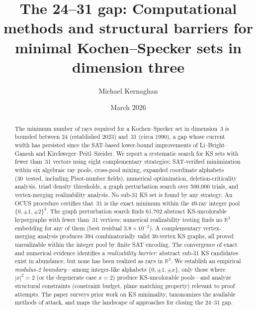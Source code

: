 \documentclass[twocolumn,pra,superscriptaddress,nofootinbib]{revtex4-2}
\newcommand{\R}{\mathbb{R}}
\begin{document}
\title{The 24--31 gap: Computational methods and structural barriers for minimal Kochen--Specker sets in dimension three}

\author{Michael Kernaghan}

\date{March 2026}

\begin{abstract}
The minimum number of rays required for a Kochen--Specker set in dimension~3
is bounded between 24 (established 2023) and~31 (circa 1990), a gap whose
current width has persisted since the SAT-based lower-bound improvements of
Li--Bright--Ganesh and Kirchweger--Peitl--Szeider.
We report a systematic search for KS sets with fewer than~31 vectors using
eight complementary strategies: SAT-verified minimization within six algebraic
ray pools, cross-pool mixing, expanded coordinate alphabets (30~tested, including
Pisot-number fields), numerical optimization, deletion-criticality analysis,
triad density thresholds, a graph perturbation search over 500,000 trials,
and vertex-merging realizability analysis.
No sub-31 KS set is found by any strategy.
An OCUS procedure certifies that~31 is the exact minimum within the 49-ray
integer pool $\{0,\pm1,\pm2\}^3$.
The graph perturbation search finds 61,702 abstract KS-uncolorable hypergraphs
with fewer than~31 vertices; numerical realizability testing finds no
$\R^3$ embedding for any of them (best residual $3.8 \times 10^{-2}$).
A complementary vertex-merging analysis produces 394 combinatorially valid
30-vertex KS graphs, all proved unrealizable within the integer pool by
finite SAT encoding.
The convergence of exact and numerical evidence identifies a
\emph{realizability barrier}: abstract sub-31 KS candidates exist in
abundance, but none has been realized as rays in $\R^3$.
We establish an empirical \emph{modulus-2 boundary}---among integer-like
alphabets $\{0,\pm1,\pm x\}$, only those where $|x|^2 = 2$ (or the
degenerate case $x = 2$) produce KS-uncolorable pools---and
analyze structural constraints (constraint budget, plane matching property)
relevant to proof attempts.
The paper surveys prior work on KS minimality, taxonomizes the available
methods of attack, and maps the landscape of approaches for closing the
24--31 gap.
\end{abstract}

\maketitle
\end{document}

